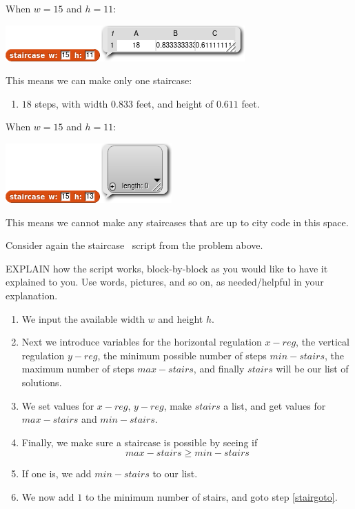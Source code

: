 \documentclass[noauthor,nooutcomes,12pt,handout]{ximera}
\begin{document}
\begin{question}
\begin{freeResponse}
  When $w=15$ and $h=11$:
   \begin{center}
    \includegraphics{answer-15-11-script.png}
   \end{center}
   This means we can make only one staircase:
   \begin{enumerate}
   \item $18$ steps, with width $0.833$ feet, and height of $0.611$ feet.
   \end{enumerate}


   When $w=15$ and $h=11$:
   \begin{center}
    \includegraphics{answer-15-13-script.png}
  \end{center}
   This means we cannot make any staircases that are up to city code in this space.
\end{freeResponse}
\end{question}
\mynewpage

\begin{question}
  Consider again the staircase \snap\ script from the problem above.
  
  EXPLAIN how the script works, block-by-block as you would like to
  have it explained to you. Use words, pictures, and so on, as
  needed/helpful in your explanation.

  \begin{freeResponse}
    \begin{enumerate}
    \item We input the available width $w$ and height $h$.
    \item Next we introduce variables for the horizontal regulation
      $x-reg$, the vertical regulation $y-reg$, the minimum possible
      number of steps $min-stairs$, the maximum number of steps
      $max-stairs$, and finally $stairs$ will be our list of
      solutions.
    \item We set values for $x-reg$, $y-reg$, make $stairs$ a list,
      and get values for $max-stairs$ and $min-stairs$.
    \item\label{stairgoto} Finally, we make sure a staircase is possible by seeing if
      \[
      max-stairs \ge min-stairs
      \]
    \item If one is, we add $min-stairs$ to our list.
    \item We now add $1$ to the minimum number of stairs, and goto step \ref{stairgoto}.
    \end{enumerate}
  \end{freeResponse}
\end{question}
\mynewpage
\end{document}
